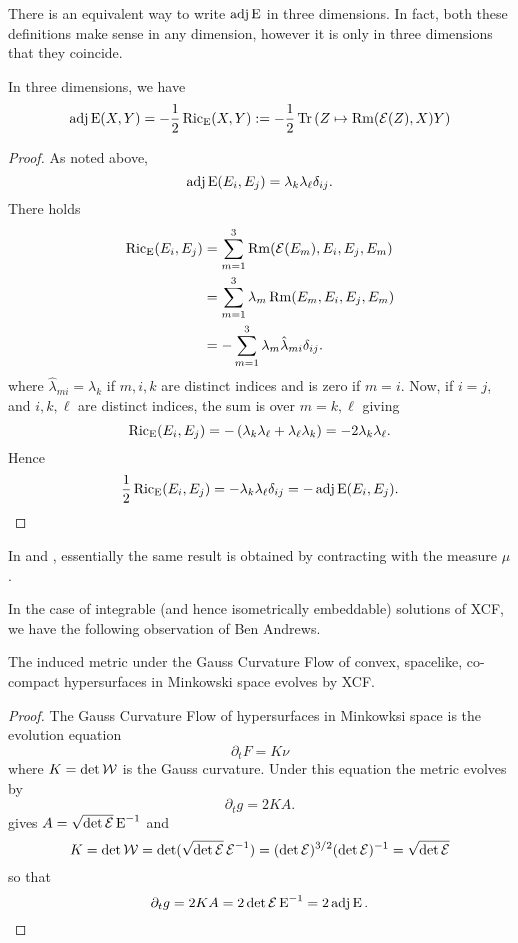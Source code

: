 \documentclass[a4paper,12pt]{amsart}
\begin{document}
There is an equivalent way to write \(\operatorname{adj}\operatorname{E}\) in three dimensions. In fact, both these definitions make sense in any dimension, however it is only in three dimensions that they coincide.
\begin{lemma}
\label{lem:xcf_equiv}

In three dimensions, we have
\[
\operatorname{adj}\operatorname{E}(X, Y) = -\frac{1}{2} \operatorname{Ric}_{\operatorname{E}} (X, Y) :=- \frac{1}{2} \operatorname{Tr} \left(Z \mapsto \operatorname{Rm}(\operatorname{\mathcal{E}}(Z), X) Y\right)
\]
\end{lemma}
\begin{proof}
As noted above,
\[
\operatorname{adj}\operatorname{E}(E_i, E_j) = \lambda_k \lambda_{\ell} \delta_{ij}.
\]
There holds
\[
\begin{split}
\operatorname{Ric}_{\operatorname{E}}(E_i, E_j) &= \sum_{m=1}^3 \operatorname{Rm}(\operatorname{\mathcal{E}}(E_m), E_i, E_j, E_m) \\
&= \sum_{m=1}^3 \lambda_m \operatorname{Rm}(E_m, E_i, E_j, E_m) \\
&= -\sum_{m=1}^3 \lambda_m \hat{\lambda}_{mi}\delta_{ij}.
\end{split}
\]
where \(\hat{\lambda}_{mi} = \lambda_k\) if \(m,i,k\) are distinct indices and is zero if \(m=i\). Now, if \(i = j\), and \(i, k, \ell\) are distinct indices, the sum is over \(m=k, \ell\) giving
\[
\operatorname{Ric}_{\operatorname{E}}(E_i, E_j) = -\left(\lambda_k \lambda_{\ell} + \lambda_{\ell} \lambda_k\right) = -2\lambda_k \lambda_{\ell}.
\]
Hence
\[
\frac{1}{2} \operatorname{Ric}_{\operatorname{E}}(E_i, E_j) =  -\lambda_k \lambda_{\ell} \delta_{ij} = -\operatorname{adj}\operatorname{E}(E_i, E_j).
\]
\end{proof}

\begin{rem}
In \cite[Lemma 3]{MR2055396} and \cite[Equation (3)]{MR2207496}, essentially the same result is obtained by contracting with the measure \(\mu\).
\end{rem}

In the case of integrable (and hence isometrically embeddable) solutions of XCF, we have the following observation of Ben Andrews.

\begin{lemma}[{\cite[Section 11]{MR3344442}}]
\label{lem:xcf_gcf}
The induced metric under the Gauss Curvature Flow of convex, spacelike, co-compact hypersurfaces in Minkowski space evolves by XCF.
\end{lemma}

\begin{proof}
The Gauss Curvature Flow of hypersurfaces in Minkowksi space is the evolution equation
\[
\partial_t F = K\nu
\]
where \(K = \det \operatorname{\mathcal{W}}\) is the Gauss curvature. Under this equation the metric evolves by
\[
\partial_t g = 2KA.
\]
 gives \(A = \sqrt{\det \operatorname{\mathcal{E}}} \operatorname{E}^{-1}\) and
\[
K = \det \operatorname{\mathcal{W}} = \det (\sqrt{\det \operatorname{\mathcal{E}}} \operatorname{\mathcal{E}}^{-1}) = (\det \operatorname{\mathcal{E}})^{3/2} (\det \operatorname{\mathcal{E}})^{-1} = \sqrt{\det \operatorname{\mathcal{E}}}
\]
so that
\[
\partial_t g = 2KA = 2 \det \operatorname{\mathcal{E}} \operatorname{E}^{-1} = 2 \operatorname{adj} \operatorname{E}.
\]
\end{proof}
\end{document}
